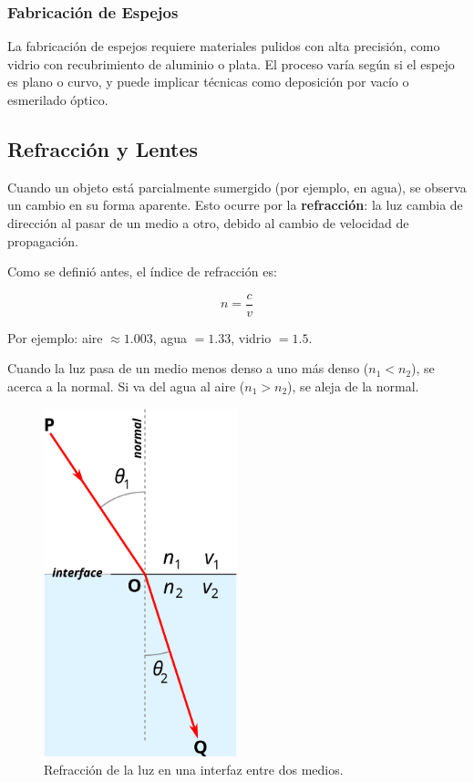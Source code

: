 \subsubsection*{Fabricación de Espejos}

La fabricación de espejos requiere materiales pulidos con alta precisión, como vidrio con recubrimiento de aluminio o plata. El proceso varía según si el espejo es plano o curvo, y puede implicar técnicas como deposición por vacío o esmerilado óptico.

\subsection{Refracción y Lentes}

Cuando un objeto está parcialmente sumergido (por ejemplo, en agua), se observa un cambio en su forma aparente. Esto ocurre por la \textbf{refracción}: la luz cambia de dirección al pasar de un medio a otro, debido al cambio de velocidad de propagación.

Como se definió antes, el índice de refracción es:

\begin{equation}
	n = \frac{c}{v}
	\label{eq:indice_refraccion}
\end{equation}

Por ejemplo: aire $\approx 1.003$, agua $= 1.33$, vidrio $= 1.5$.

Cuando la luz pasa de un medio menos denso a uno más denso ($n_1 < n_2$), se acerca a la normal. Si va del agua al aire ($n_1 > n_2$), se aleja de la normal.

\begin{figure}[ht]
	\centering
	\includegraphics[width=0.5\textwidth]{images/Snells_law2.png}
	\caption{Refracción de la luz en una interfaz entre dos medios.}
	\label{fig:snell_law}
\end{figure}


